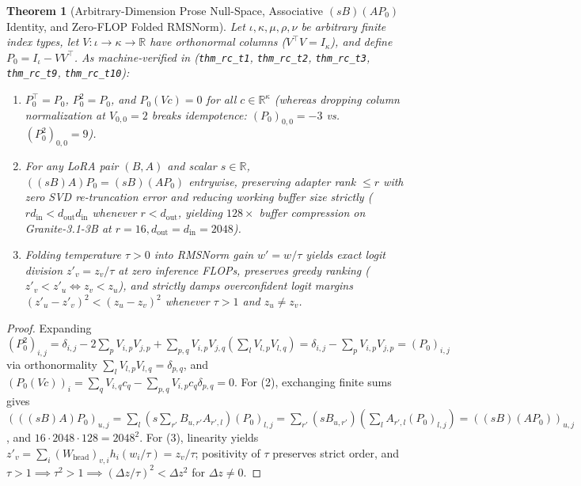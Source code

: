 \documentclass[11pt,a4paper]{article}
\newtheorem{theorem}{Theorem}[section]
\begin{document}
\begin{theorem}[Arbitrary-Dimension Prose Null-Space, Associative $(sB)(AP_0)$ Identity, and Zero-FLOP Folded RMSNorm]
\label{thm:v440_rc_core}
Let $\iota, \kappa, \mu, \rho, \nu$ be arbitrary finite index types, let $V : \iota \to \kappa \to \mathbb{R}$ have orthonormal columns ($V^\top V = I_\kappa$), and define $P_0 = I_\iota - V V^\top$. As machine-verified in  (\texttt{thm\_rc\_t1}, \texttt{thm\_rc\_t2}, \texttt{thm\_rc\_t3}, \texttt{thm\_rc\_t9}, \texttt{thm\_rc\_t10}):
\begin{enumerate}[leftmargin=1.6em]
    \item $P_0^\top = P_0$, $P_0^2 = P_0$, and $P_0(Vc) = 0$ for all $c \in \mathbb{R}^\kappa$ (whereas dropping column normalization at $V_{0,0}=2$ breaks idempotence: $(P_0)_{0,0}=-3$ vs.\ $(P_0^2)_{0,0}=9$).
    \item For any LoRA pair $(B, A)$ and scalar $s \in \mathbb{R}$, $((sB)A)P_0 = (sB)(AP_0)$ entrywise, preserving adapter rank $\le r$ with zero SVD re-truncation error and reducing working buffer size strictly ($r d_{\mathrm{in}} < d_{\mathrm{out}} d_{\mathrm{in}}$ whenever $r < d_{\mathrm{out}}$, yielding $128\times$ buffer compression on Granite-3.1-3B at $r=16, d_{\mathrm{out}}=d_{\mathrm{in}}=2048$).
    \item Folding temperature $\tau > 0$ into RMSNorm gain $w' = w/\tau$ yields exact logit division $z'_v = z_v/\tau$ at zero inference FLOPs, preserves greedy ranking ($z'_v < z'_u \iff z_v < z_u$), and strictly damps overconfident logit margins $(z'_u - z'_v)^2 < (z_u - z_v)^2$ whenever $\tau > 1$ and $z_u \neq z_v$.
\end{enumerate}
\end{theorem}
\begin{proof}
Expanding $(P_0^2)_{i,j} = \delta_{i,j} - 2\sum_p V_{i,p}V_{j,p} + \sum_{p,q} V_{i,p}V_{j,q}(\sum_l V_{l,p}V_{l,q}) = \delta_{i,j} - \sum_p V_{i,p}V_{j,p} = (P_0)_{i,j}$ via orthonormality $\sum_l V_{l,p}V_{l,q} = \delta_{p,q}$, and $(P_0(Vc))_i = \sum_q V_{i,q}c_q - \sum_{p,q} V_{i,p}c_q\delta_{p,q} = 0$. For (2), exchanging finite sums gives $(((sB)A)P_0)_{u,j} = \sum_l (s\sum_{r'} B_{u,r'} A_{r',l})(P_0)_{l,j} = \sum_{r'} (s B_{u,r'})(\sum_l A_{r',l}(P_0)_{l,j}) = ((sB)(AP_0))_{u,j}$, and $16 \cdot 2048 \cdot 128 = 2048^2$. For (3), linearity yields $z'_v = \sum_i (W_{\mathrm{head}})_{v,i} h_i (w_i/\tau) = z_v/\tau$; positivity of $\tau$ preserves strict order, and $\tau > 1 \implies \tau^2 > 1 \implies (\Delta z/\tau)^2 < \Delta z^2$ for $\Delta z \neq 0$.
\end{proof}
\end{document}
